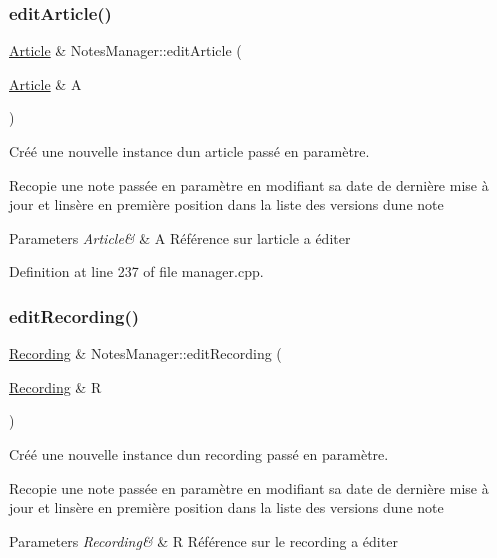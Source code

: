 \subsubsection{\texorpdfstring{edit\+Article()}{editArticle()}}
{\footnotesize\ttfamily \hyperlink{class_article}{Article} \& Notes\+Manager\+::edit\+Article (\begin{DoxyParamCaption}\item[{\hyperlink{class_article}{Article} \&}]{A }\end{DoxyParamCaption})}



Créé une nouvelle instance d\textquotesingle{}un article passé en paramètre. 

Recopie une note passée en paramètre en modifiant sa date de dernière mise à jour et l\textquotesingle{}insère en première position dans la liste des versions d\textquotesingle{}une note 
\begin{DoxyParams}{Parameters}
{\em Article\&} & A Référence sur l\textquotesingle{}article a éditer \\
\hline
\end{DoxyParams}


Definition at line 237 of file manager.\+cpp.

\mbox{\label{class_notes_manager_a1c4cfa021a12b6416c4e800d643b5e0a}} 
\subsubsection{\texorpdfstring{edit\+Recording()}{editRecording()}}
{\footnotesize\ttfamily \hyperlink{class_recording}{Recording} \& Notes\+Manager\+::edit\+Recording (\begin{DoxyParamCaption}\item[{\hyperlink{class_recording}{Recording} \&}]{R }\end{DoxyParamCaption})}



Créé une nouvelle instance d\textquotesingle{}un recording passé en paramètre. 

Recopie une note passée en paramètre en modifiant sa date de dernière mise à jour et l\textquotesingle{}insère en première position dans la liste des versions d\textquotesingle{}une note 
\begin{DoxyParams}{Parameters}
{\em Recording\&} & R Référence sur le recording a éditer \\
\hline
\end{DoxyParams}


